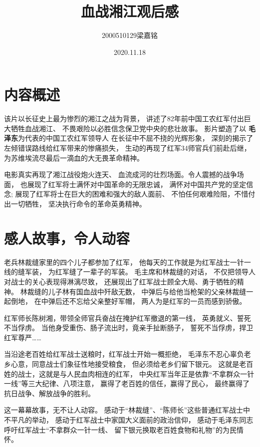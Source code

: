 \documentclass[a4paper]{article}
\title{\heiti\zihao{3} 血战湘江观后感}
\author{\songti 2000510129梁嘉铭}
\date{2020.11.18}
\begin{document}
\maketitle
\section{内容概述}
该片以长征史上最为惨烈的湘江之战为背景，
讲述了82年前中国工农红军付出巨大牺牲血战湘江、
不畏艰险以必胜信念保卫党中央的悲壮故事。
影片塑造了以
\textbf{毛泽东}为代表的中国工农红军领导人
在长征中不屈不挠的光辉形象，
深刻的揭示了左倾错误路线给红军带来的惨痛损失，
生动的再现了红军34师官兵们前赴后继，
为苏维埃流尽最后一滴血的大无畏革命精神。


电影真实再现了湘江战役炮火连天、
血流成河的壮烈场面。令人震撼的战争场面，
也展现了红军将士满怀对中国革命的无限忠诚，
满怀对中国共产党的坚定信念;
展现了红军将士在巨大的困难和强大的敌人面前、
不怕任何艰难险阻，不惜付出一切牺牲，
坚决执行命令的革命英勇精神。
\maketitle
\section{感人故事，令人动容}
老兵林裁缝家里的四个儿子都参加了红军，
他每天的工作就是为红军战士一针一线的缝军装，
为红军缝了一辈子的军装。
毛主席和林裁缝的对话，
不仅把领导人对战士的关心表现得淋漓尽致，
还展现出了红军战士顾全大局、勇于牺牲的精神。
林裁缝的儿子林有国血战中歼敌无数，
中弹后与给他当枪架的父亲林裁缝一起倒地，
在中弹后还不忘给父亲整好军帽，
两人为是红军的一员而感到骄傲。


红军师长陈树湘，带领全师官兵奋战在掩护红军撤退的第一线，
英勇就义、誓死不当俘虏。
当他身受重伤、肠子流出时，竟亲手扯断肠子，
誓死不当俘虏，捍卫红军尊严……


当沿途老百姓给红军战士送粮时，红军战士开始一概拒绝，
毛泽东不忍心辜负老乡心意，同意战士们象征性地接受粮食，
但必须给老乡们留下银元。
这就是老百姓的战士，这就是与人民血肉相连的红军，
中央红军当年正是依靠“不拿群众一针一线”等三大纪律、八项注意，
赢得了老百姓的信任，赢得了民心，
最终赢得了抗日战争、解放战争的胜利。


这一幕幕故事，无不让人动容。
感动于“林裁缝”、“陈师长”这些普通红军战士中不平凡的举动，
感动于红军战士中家国大义面前的政治信仰，
感动于毛泽东同志呼吁红军战士“不拿群众一针一线、
留下银元换取老百姓食物和礼物”的为民情怀。
\maketitle
\end{document}
